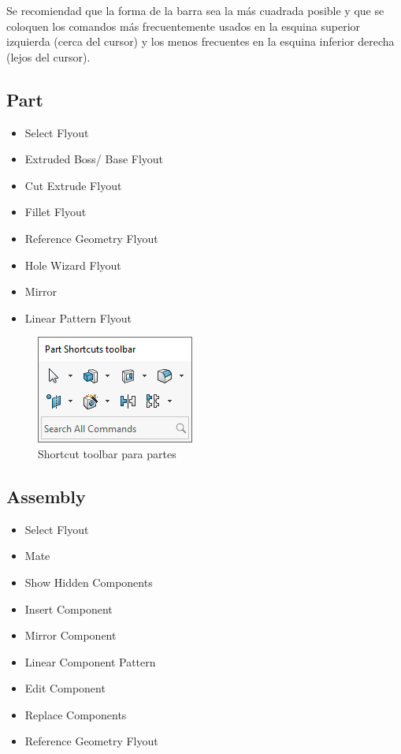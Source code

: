 \documentclass[12pt,letterpaper,final]{report}
\begin{document}
Se recomiendad que la forma de la barra sea la más cuadrada posible y que se coloquen los comandos más frecuentemente usados en la esquina superior izquierda (cerca del cursor) y los menos frecuentes en la esquina inferior derecha (lejos del cursor).

\subsection{Part}

\begin{itemize}
	\item Select Flyout
	\item Extruded Boss/ Base Flyout
	\item Cut Extrude Flyout
	\item Fillet Flyout
	\item Reference Geometry Flyout
	\item Hole Wizard Flyout
	\item Mirror
	\item Linear Pattern Flyout
\end{itemize}

\begin{figure}[H]
	\centering
	\includegraphics[width=0.45\linewidth, height=0.5\textheight,keepaspectratio]{Imagenes/solidworks_shortcutbars_03}
	\caption{Shortcut toolbar para partes}
	\label{fig:solidworksshortcutbars03}
\end{figure}

\subsection{Assembly}

\begin{itemize}
	\item Select Flyout
	\item Mate
	\item Show Hidden Components
	\item Insert Component
	\item Mirror Component
	\item Linear Component Pattern
	\item Edit Component
	\item Replace Components
	\item Reference Geometry Flyout
\end{itemize}
\end{document}
